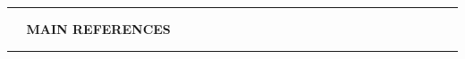 \documentclass[11pt, compress, t, notes = noshow, xcolor = table, 
aspectratio = 1610]{beamer}
\newcommand{\highlight}[1]{\textcolor{highlightcol}{\textbf{#1}}}
\begin{document}

\LARGE
\begin{frame}{\phantom{foo}}
\normalsize
\vspace{-0.5cm}
\noindent \textcolor{gray!90}{\rule{\textwidth}{1pt}}
\smallskip

\Huge
\hspace{0pt}
\vfill
\textbf{\highlight{~~ MAIN REFERENCES}}
\vfill
\hspace{0pt}

\noindent \textcolor{gray!90}{\rule{\textwidth}{1pt}}

\end{frame}


\begin{frame}{}
\footnotesize




\end{frame}


\endlecture
\end{document}
